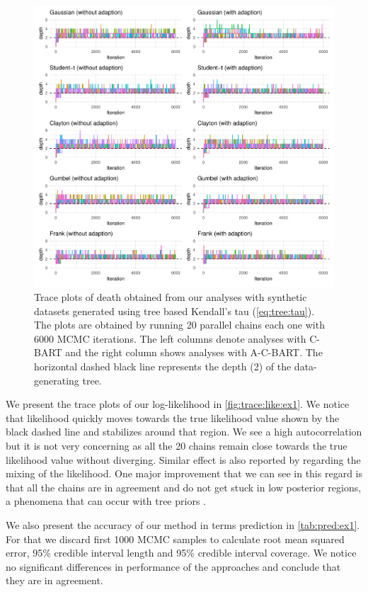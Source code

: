 \documentclass{amsart}
\begin{document}
\begin{figure}
	\centering
	\includegraphics[width = 0.95\linewidth]{"case_1_depth.pdf"}
	\caption{Trace plots of death obtained from our analyses with synthetic datasets generated using tree based Kendall's tau (\cref{eq:tree:tau}). The plots are obtained by running 20 parallel chains each one with 6000 MCMC iterations. The left columns denote analyses with C-BART and the right column shows analyses with A-C-BART. The horizontal dashed black line represents the depth (2) of the data-generating tree.}
	\label{fig:trace:depth:ex1}
\end{figure}

We present the trace plots of our log-likelihood in \cref{fig:trace:like:ex1}. We notice that likelihood quickly moves towards the true likelihood value shown by the black dashed line and stabilizes around that region. We see a high autocorrelation but it is not very concerning as all the 20 chains remain close towards the true likelihood value without diverging. Similar effect is also reported by \citet{Linero02012025} regarding the mixing of the likelihood. One major improvement that we can see in this regard is that all the chains are in agreement and do not get stuck in low posterior regions, a phenomena that can occur with tree priors \cite{chipman98BCART}. 

We also present the accuracy of our method in terms prediction in \cref{tab:pred:ex1}. For that we discard first 1000 MCMC samples to calculate root mean squared error, 95\% credible interval length and 95\% credible interval coverage. We notice no significant differences in performance of the approaches and conclude that they are in agreement.
\end{document}
